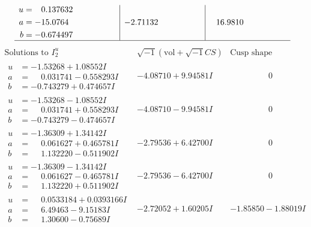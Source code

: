 \documentclass[1p]{elsarticle_modified}
\theoremstyle{definition}
\newcommand{\I}{\sqrt{-1}}
\begin{document}
$$\begin{array}{c|c|c}
\begin{aligned}
u &= \phantom{-}0.137632\phantom{ +0.000000I} \\
a &= -15.0764\phantom{ +0.000000I} \\
b &= -0.674497\phantom{ +0.000000I}\end{aligned}
 & -2.71132\phantom{ +0.000000I} & \phantom{-}16.9810\phantom{ +0.000000I}\\
 \hline 
 \end{array}$$\newpage$$\begin{array}{c|c|c}  
\text{Solutions to }I^u_{2}& \I (\text{vol} + \sqrt{-1}CS) & \text{Cusp shape}\\
 \hline 
\begin{aligned}
u &= -1.53268 + 1.08552 I \\
a &= \phantom{-}0.031741 - 0.558293 I \\
b &= -0.743279 + 0.474657 I\end{aligned}
 & -4.08710 + 9.94581 I & \phantom{-0.000000 } 0 \\ \hline\begin{aligned}
u &= -1.53268 - 1.08552 I \\
a &= \phantom{-}0.031741 + 0.558293 I \\
b &= -0.743279 - 0.474657 I\end{aligned}
 & -4.08710 - 9.94581 I & \phantom{-0.000000 } 0 \\ \hline\begin{aligned}
u &= -1.36309 + 1.34142 I \\
a &= \phantom{-}0.061627 + 0.465781 I \\
b &= \phantom{-}1.132220 - 0.511902 I\end{aligned}
 & -2.79536 + 6.42700 I & \phantom{-0.000000 } 0 \\ \hline\begin{aligned}
u &= -1.36309 - 1.34142 I \\
a &= \phantom{-}0.061627 - 0.465781 I \\
b &= \phantom{-}1.132220 + 0.511902 I\end{aligned}
 & -2.79536 - 6.42700 I & \phantom{-0.000000 } 0 \\ \hline\begin{aligned}
u &= \phantom{-}0.0533184 + 0.0393166 I \\
a &= \phantom{-}6.49463 - 9.15183 I \\
b &= \phantom{-}1.30600 - 0.75689 I\end{aligned}
 & -2.72052 + 1.60205 I & -1.85850 - 1.88019 I \\ \hline\begin{aligned}

\end{aligned}
\end{array}$$
\end{document}
